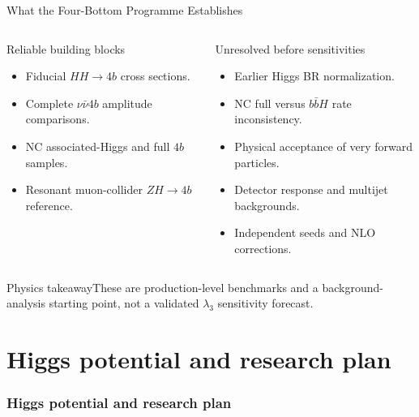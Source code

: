 \documentclass[aspectratio=1610,english]{beamer}
\newcommand{\src}[1]{\vfill{\par\color{black!65}\fontsize{6.4}{7.4}\selectfont\emph{Source:} #1\par}}
\newcommand{\key}[1]{\begin{alertblock}{Physics takeaway}\scriptsize #1\end{alertblock}}
\begin{document}
\begin{frame}[t]{What the Four-Bottom Programme Establishes}
\small

\begin{columns}%
\begin{exampleblock}{Reliable building blocks}
\begin{itemize}\item Fiducial $HH\to4b$ cross sections.
\item Complete $\nu\bar\nu4b$ amplitude comparisons.
\item NC associated-Higgs and full $4b$ samples.
\item Resonant muon-collider $ZH\to4b$ reference.
\end{itemize}\end{exampleblock}
\begin{alertblock}{Unresolved before sensitivities}
\begin{itemize}\item Earlier Higgs BR normalization.
\item NC full versus $b\bar bH$ rate inconsistency.
\item Physical acceptance of very forward particles.
\item Detector response and multijet backgrounds.
\item Independent seeds and NLO corrections.
\end{itemize}\end{alertblock}
\end{columns}
\key{These are production-level benchmarks and a background-analysis starting point, not a validated $\lambda_3$ sensitivity forecast.}

\end{frame}




\part{Higgs potential and research plan}
\section{Higgs potential and research plan}
\end{document}
